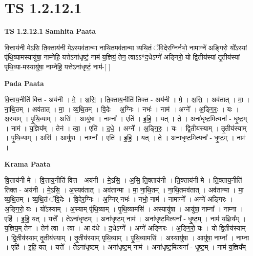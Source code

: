 \documentclass[17pt]{extarticle}
\begin{document}
\section*{ TS 1.2.12.1 }

\textbf{TS 1.2.12.1 } \newline
\textbf{Samhita Paata} \newline

वि॒त्ताय॑नी मेऽसि ति॒क्ताय॑नी मे॒ऽस्यव॑तान्मा नाथि॒तमव॑तान्मा व्यथि॒तं ॅवि॒देर॒ग्निर्नभो॒ नामाग्ने॑ अङ्गिरो॒ यो᳚ऽस्यां पृ॑थि॒व्यामस्यायु॑षा॒ नाम्नेहि॒ यत्तेऽना॑धृष्टं॒ नाम॑ य॒ज्ञियं॒ तेन॒ त्वाऽऽ*द॒धेऽग्ने॑ अङ्गिरो॒ यो द्वि॒तीय॑स्यां तृ॒तीय॑स्यां पृथि॒व्या-मस्यायु॑षा॒ नाम्नेहि॒ यत्तेऽना॑धृष्टं॒ नाम॑-[ ] \newline

\textbf{Pada Paata} \newline

वि॒त्ताय॒नीति॑ वित्त - अय॑नी । मे॒ । अ॒सि॒ । ति॒क्ताय॒नीति॑ तिक्त - अय॑नी । मे॒ । अ॒सि॒ । अव॑तात् । मा॒ । ना॒थि॒तम् । अव॑तात् । मा॒ । व्य॒थि॒तम् । वि॒देः । अ॒ग्निः । नभः॑ । नाम॑ । अग्ने᳚ । अ॒ङ्गि॒रः॒ । यः । अ॒स्याम् । पृ॒थि॒व्याम् । असि॑ । आयु॑षा । नाम्ना᳚ । एति॑ । इ॒हि॒ । यत् । ते॒ । अना॑धृष्ट॒मित्यना᳚ - धृ॒ष्ट॒म् । नाम॑ । य॒ज्ञिय᳚म् । तेन॑ । त्वा॒ । एति॑ । द॒धे॒ । अग्ने᳚ । अ॒ङ्गि॒रः॒ । यः । द्वि॒तीय॑स्याम् । तृ॒तीय॑स्याम् । पृ॒थि॒व्याम् । असि॑ । आयु॑षा । नाम्ना᳚ । एति॑ । इ॒हि॒ । यत् । ते॒ । अना॑धृष्ट॒मित्यना᳚ - धृ॒ष्ट॒म् । नाम॑ ।  \newline


\textbf{Krama Paata} \newline

वि॒त्ताय॑नी मे । वि॒त्ताय॒नीति॑ वित्त - अय॑नी । मे॒ऽसि॒ । अ॒सि॒ ति॒क्ताय॑नी । ति॒क्ताय॑नी मे । ति॒क्ताय॒नीति॑ तिक्त - अय॑नी । मे॒ऽसि॒ । अ॒स्यव॑तात् । अव॑तान्मा । मा॒ ना॒थि॒तम् । ना॒थि॒तमव॑तात् । अव॑तान्मा । मा॒ व्य॒थि॒तम् । व्य॒थि॒तं ॅवि॒देः । वि॒देर॒ग्निः । अ॒ग्निर् नभः॑ । नभो॒ नाम॑ । नामाग्ने᳚ । अग्ने॑ अङ्गिरः । अ॒ङ्गि॒रो॒ यः । यो᳚ऽस्याम् । अ॒स्याम् पृ॑थि॒व्याम् । पृ॒थि॒व्यामसि॑ । अस्यायु॑षा । आयु॑षा॒ नाम्ना᳚ । नाम्ना । एहि॑ । इ॒हि॒ यत् । यत्ते᳚ । तेऽना॑धृष्टम् । अना॑धृष्ट॒म् नाम॑ । अना॑धृष्ट॒मित्यना᳚ - धृ॒ष्ट॒म् । नाम॑ य॒ज्ञिय᳚म् । य॒ज्ञिय॒म् तेन॑ । तेन॑ त्वा । त्वा । आ द॑धे । द॒धेऽग्ने᳚ । अग्ने॑ अङ्गिरः । अ॒ङ्गि॒रो॒ यः । यो द्वि॒तीय॑स्याम् । द्वि॒तीय॑स्याम् तृ॒तीय॑स्याम् । तृ॒तीय॑स्याम् पृथि॒व्याम् । पृ॒थि॒व्यामसि॑ । अस्यायु॑षा । आयु॑षा॒ नाम्ना᳚ । नाम्ना । एहि॑ । इ॒हि॒ यत् । यत्ते᳚ । तेऽना॑धृष्टम् । अना॑धृष्ट॒म् नाम॑ । अना॑धृष्ट॒मित्यना᳚ - धृ॒ष्ट॒म् । नाम॑ य॒ज्ञिय᳚म् \newline
\end{document}
